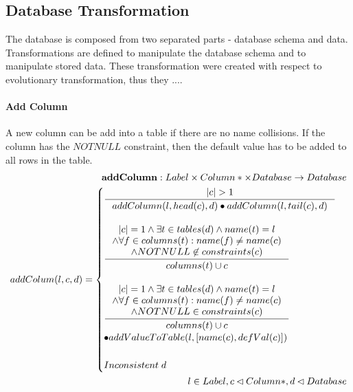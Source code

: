 \documentclass[11pt]{article}
\begin{document}
\subsection{Database Transformation}
The database is composed from two separated parts - database schema and data. Transformations are defined to manipulate the database schema and to manipulate stored data. These transformation were created with respect to evolutionary transformation, thus they ....

\paragraph{Add Column} A new column can be add into a table if there are no name collisions. If the column has the $NOTNULL$ constraint, then the default value has to be added to all rows in the table.
\begin{align*}
	\mathbf{addColumn} : Label \times Column* \times Database \rightarrow Database \\ 	
	addColum(l, c, d) = \begin{cases}
		\inference{|c| > 1}{addColumn(l, head(c), d) \bullet addColumn(l, tail(c), d)} \\ \\
		\inference{|c| = 1 \wedge \exists t \in tables(d) \wedge name(t) = l \\ \wedge \forall f \in columns(t) : name(f) \neq name(c) \\ \wedge NOTNULL \not \in constraints(c) }{columns(t) \cup c}\\ \\
		\inference{|c| = 1 \wedge \exists t \in tables(d) \wedge name(t) = l \\ \wedge \forall f \in columns(t) : name(f) \neq name(c) \\ \wedge NOTNULL \in constraints(c) }{columns(t) \cup c}\\ \bullet addValueToTable(l, [name(c), defVal(c)]) \\ \\
		Inconsistent \;d 
	 \end{cases}\\ 
	 l \in Label, c \lhd Column*,d \lhd Database
\end{align*}
\end{document}
